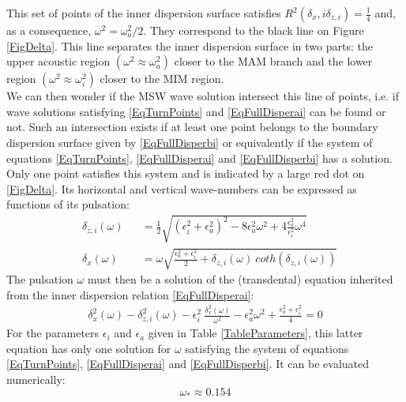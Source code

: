 \documentclass[a4paper,11pt]{article}
\begin{document}
This set of points of the inner dispersion surface satisfies $\displaystyle R^2(\delta_x,i \delta_{z,i})= \frac{1}{4}$ and, as a consequence,
$\omega^2=\omega_a^2/2$. They correspond to the black line on Figure \ref{FigDelta}. This line separates the inner dispersion surface in two parts: the upper acoustic region $(\omega^2\approx\omega_a^2)$ closer to the MAM branch and the lower region $(\omega^2\approx\omega_i^2)$ closer to the MIM region.\\
We can then wonder if the MSW wave solution intersect this line of points, i.e. if wave solutions satisfying \ref{EqTurnPoints} and \ref{EqFullDisperai} can be found or not. Such an intersection exists if at least one point belongs to the boundary dispersion surface given by \ref{EqFullDisperbi} or equivalently if the system of equations \ref{EqTurnPoints}, \ref{EqFullDisperai} and \ref{EqFullDisperbi} has a solution. Only one point satisfies this system and is indicated by a large red dot on \ref{FigDelta}. Its horizontal and vertical wave-numbers can be expressed as functions of its pulsation:
\begin{subequations}
	\begin{alignat}{2}	
	   \label{ParamSolDelta}
	   &\delta_{z,i}(\omega) && =\frac{1}{2} 
	   \sqrt{(\epsilon_i^2+\epsilon_a^2)^2 
	   - 8 \epsilon_a^2 \omega^2
	   + 4 \frac{\epsilon_a^2}{\epsilon_i^2} \omega^4}\\[3mm]
	   &\delta_x(\omega) &&=\omega
	   \sqrt{\frac{\epsilon_a^2+\epsilon_i^2}{2}
	   +\delta_{z,i}(\omega)\ coth(\delta_{z,i}(\omega))}
	\end{alignat}
\end{subequations}
The pulsation $\omega$ must then be a solution of the (transdental) equation inherited from the inner dispersion relation \ref{EqFullDisperai}:
\begin{subequations}
	\begin{alignat}{2}	
	   \label{ParamSolDelta2}
 		\delta_x^2(\omega)-\delta_{z,i}^2(\omega) 
 		-\epsilon_i^2\ \frac{\delta_x^2(\omega)}
 			{\omega^2}-\epsilon_a^2\omega^2
 		+\frac{\epsilon_a^2+\epsilon_i^2}{4} = 0
	\end{alignat}
\end{subequations}
For the parameters $\epsilon_i$ and $\epsilon_a$ given in Table \ref{TableParameters}, this latter equation has only one solution for $\omega$ satisfying the system of equations \ref{EqTurnPoints}, \ref{EqFullDisperai} and \ref{EqFullDisperbi}. It can be evaluated numerically:
\begin{equation}
	\omega_* \approx 0.154
\end{equation}
\end{document}

